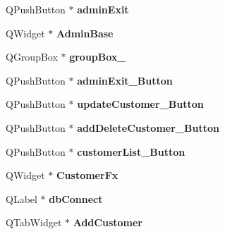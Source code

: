 \begin{DoxyCompactItemize}
\item 
\mbox{\label{class_ui___main_window_a14547b06f96c9603a83f42f899ee5ab2}} 
Q\+Push\+Button $\ast$ {\bfseries admin\+Exit}
\item 
\mbox{\label{class_ui___main_window_a9a135a40d5499e76a063f20a0f79376d}} 
Q\+Widget $\ast$ {\bfseries Admin\+Base}
\item 
\mbox{\label{class_ui___main_window_abb28acde35ffce4d0e6152579df2cbc3}} 
Q\+Group\+Box $\ast$ {\bfseries group\+Box\+\_}
\item 
\mbox{\label{class_ui___main_window_a39c1cd485c97583173618ab1785f6366}} 
Q\+Push\+Button $\ast$ {\bfseries admin\+Exit\+\_\+\+Button}
\item 
\mbox{\label{class_ui___main_window_a5840c8779252d33e0f56ed1fbf6bae98}} 
Q\+Push\+Button $\ast$ {\bfseries update\+Customer\+\_\+\+Button}
\item 
\mbox{\label{class_ui___main_window_ad775a565f6e6be2d30285b35377fecd6}} 
Q\+Push\+Button $\ast$ {\bfseries add\+Delete\+Customer\+\_\+\+Button}
\item 
\mbox{\label{class_ui___main_window_a27d575bd6c10f774c80da3b3982105f3}} 
Q\+Push\+Button $\ast$ {\bfseries customer\+List\+\_\+\+Button}
\item 
\mbox{\label{class_ui___main_window_a89a61d699575279e0ffd7f9b2356acb6}} 
Q\+Widget $\ast$ {\bfseries Customer\+Fx}
\item 
\mbox{\label{class_ui___main_window_a780faab522f8a2aebde09f541bd39c92}} 
Q\+Label $\ast$ {\bfseries db\+Connect}
\item 
\mbox{\label{class_ui___main_window_a6f38f4ef9943a611f7c998ee45db1b83}} 
Q\+Tab\+Widget $\ast$ {\bfseries Add\+Customer}
\item 
\mbox{\label{class_ui___main_window_a3efc28c664e9f5115095aafbbc5ac6bc}} 

\end{DoxyCompactItemize}
